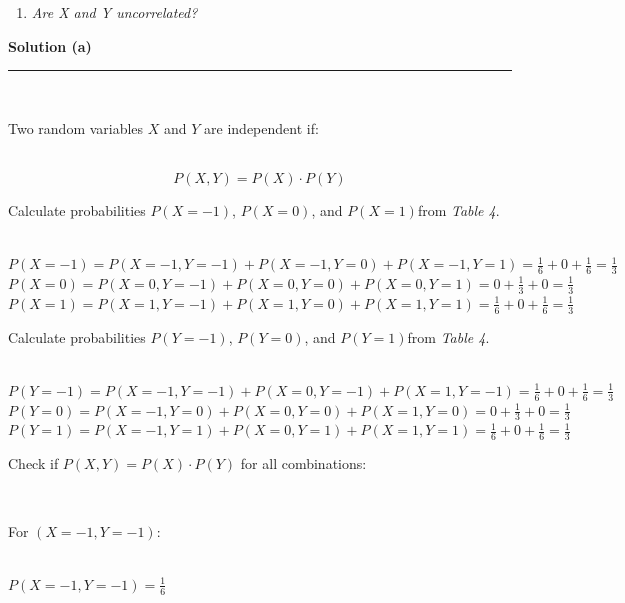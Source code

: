 \documentclass{article}
\begin{document}
\begin{enumerate}[label=(b)]
  \item \textit{Are X and Y uncorrelated?}
\end{enumerate}

\textbf{Solution (a)}

\noindent\rule{\textwidth}{0.4pt}\\

\parbox{\textwidth}{Two random variables $X$ and $Y$ are independent if:}\\

$$P(X, Y) = P(X) \cdot P(Y)$$


\parbox{\textwidth}{Calculate probabilities $P(X = -1)$, $P(X = 0)$, and $P(X = 1)$from \textit{Table 4}.}\\

$P(X = -1) = P(X = -1, Y = -1) + P(X = -1, Y = 0) + P(X = -1, Y = 1) = \frac{1}{6} + 0 + \frac{1}{6} = \frac{1}{3}$\\

$P(X = 0) = P(X = 0, Y = -1) + P(X = 0, Y = 0) + P(X = 0, Y = 1) = 0 + \frac{1}{3} + 0 =\frac{1}{3}$\\

$P(X = 1) = P(X = 1, Y = -1) + P(X = 1, Y = 0) + P(X = 1, Y = 1) = \frac{1}{6} + 0 + \frac{1}{6} = \frac{1}{3}$\\


\parbox{\textwidth}{Calculate probabilities $P(Y = -1)$, $P(Y = 0)$, and $P(Y = 1)$from \textit{Table 4}.}\\

$P(Y = -1) = P(X = -1, Y = -1) + P(X = 0, Y = -1) + P(X = 1, Y = -1) =  \frac{1}{6} + 0 + \frac{1}{6} = \frac{1}{3}$\\

$P(Y = 0) = P(X = -1, Y = 0) + P(X = 0, Y = 0) + P(X = 1, Y = 0)= 0 + \frac{1}{3} + 0 =\frac{1}{3}$\\

$P(Y = 1) = P(X = -1, Y = 1) + P(X = 0, Y = 1) + P(X = 1, Y = 1) = \frac{1}{6} + 0 + \frac{1}{6} = \frac{1}{3}$\\


\parbox{\textwidth}{Check if $P(X , Y) = P(X) \cdot P(Y)$ for all combinations:}\\

\parbox{\textwidth}{For $(X = -1, Y = -1)$:}\\

$P(X = -1, Y = -1) = \frac{1}{6}$\\
\end{document}

